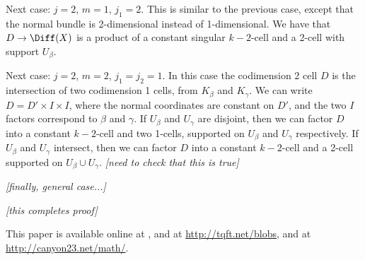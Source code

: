 \documentclass[11pt,leqno]{amsart}
\def\nn#1{{{\it \small [#1]}}}
\begin{document}
Next case: $j=2$, $m=1$, $j_1 = 2$.
This is similar to the previous case, except that the normal bundle is 2-dimensional instead of
1-dimensional.
We have that $D \to \Diff(X)$ is a product of a constant singular $k{-}2$-cell
and a 2-cell with support $U_\beta$.

Next case: $j=2$, $m=2$, $j_1 = j_2 = 1$.
In this case the codimension 2 cell $D$ is the intersection of two
codimension 1 cells, from $K_\beta$ and $K_\gamma$.
We can write $D = D' \times I \times I$, where the normal coordinates are constant
on $D'$, and the two $I$ factors correspond to $\beta$ and $\gamma$.
If $U_\beta$ and $U_\gamma$ are disjoint, then we can factor $D$ into a constant $k{-}2$-cell and
two 1-cells, supported on $U_\beta$ and $U_\gamma$ respectively.
If $U_\beta$ and $U_\gamma$ intersect, then we can factor $D$ into a constant $k{-}2$-cell and
a 2-cell supported on $U_\beta \cup U_\gamma$.
\nn{need to check that this is true}

\nn{finally, general case...}

\nn{this completes proof}








This paper is available online at , and at
\url{http://tqft.net/blobs},
and at \url{http://canyon23.net/math/}.

\end{document}
